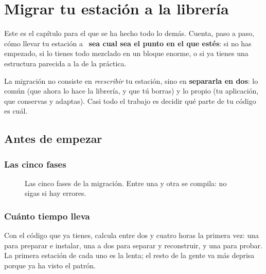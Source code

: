 \chapter{Migrar tu estación a la librería}\label{cap:migracion}

Este es el capítulo para el que se ha hecho todo lo demás. Cuenta, paso a paso, cómo llevar tu estación a \lib\ \textbf{sea cual sea el punto en el que estés}: si no has empezado, si lo tienes todo mezclado en un bloque enorme, o si ya tienes una estructura parecida a la de la práctica.

\begin{idea}
La migración no consiste en \emph{reescribir} tu estación, sino en \textbf{separarla en dos}: lo común (que ahora lo hace la librería, y que tú borras) y lo propio (tu aplicación, que conservas y adaptas). Casi todo el trabajo es decidir qué parte de tu código es cuál.
\end{idea}

\section{Antes de empezar}

\subsection{Las cinco fases}
\begin{figure}[ht]
\centering
{}
\caption{Las cinco fases de la migración. Entre una y otra se compila: no sigas si hay errores.}
\end{figure}

\subsection{Cuánto tiempo lleva}
Con el código que ya tienes, calcula entre dos y cuatro horas la primera vez: una para preparar e instalar, una a dos para separar y reconstruir, y una para probar. La primera estación de cada uno es la lenta; el resto de la gente va más deprisa porque ya ha visto el patrón.

